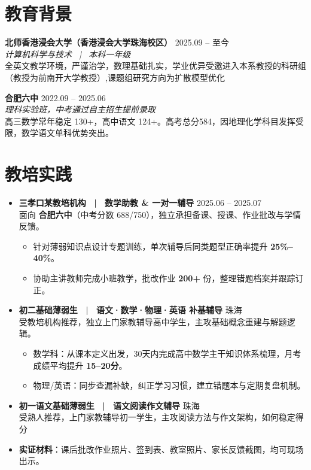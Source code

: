 \documentclass[11pt,a4paper]{ctexart}
\begin{document}
\section{\faUniversity \quad 教育背景}
\textbf{北师香港浸会大学（香港浸会大学珠海校区）} \hfill 2025.09 -- 至今\\
\textit{计算机科学与技术 \ | \ 本科一年级}\\
\textcolor{darktext}{全英文教学环境，严谨治学，数理基础扎实，学业优异受邀进入本系教授的科研组（教授为前南开大学教授）,课题组研究方向为扩散模型优化}

\vspace{2pt}
\textbf{合肥六中} \hfill 2022.09 -- 2025.06\\
\textit{理科实验班，中考通过自主招生提前录取}\\
\textcolor{darktext}{高三数学常年稳定 130+，高中语文 124+。高考总分584，因地理化学科目发挥受限，数学语文单科优势突出。}

\section{\faChalkboardTeacher \quad 教培实践}
\begin{itemize}[leftmargin=1.2em]
    \item \textbf{三孝口某教培机构 \ | \ 数学助教 \& 一对一辅导} \hfill 2025.06 -- 2025.07\\
    面向 \textbf{合肥六中}（中考分数 688/750），独立承担备课、授课、作业批改与学情反馈。
    \begin{itemize}
        \item 针对薄弱知识点设计专题训练，单次辅导后同类题型正确率提升 \textbf{25\%--40\%}。
        \item 协助主讲教师完成小班教学，批改作业 \textbf{200+} 份，整理错题档案并跟踪订正。
    \end{itemize}

    \item \textbf{初二基础薄弱生 \ | \ 语文·数学·物理·英语 补基辅导} \hfill 珠海\\
    受教培机构推荐，独立上门家教辅导高中学生，主攻基础概念重建与解题逻辑。
    \begin{itemize}
        \item 数学科：从课本定义出发，30天内完成高中数学主干知识体系梳理，月考成绩平均提升 \textbf{15--20分}。
        \item 物理/英语：同步查漏补缺，纠正学习习惯，建立错题本与定期复盘机制。
    \end{itemize}
     \item \textbf{初一语文基础薄弱生 \ | \ 语文阅读作文辅导} \hfill 珠海\\
    受熟人推荐，上门家教辅导初一学生，主攻阅读方法与作文架构，如何稳定得分
    
    \item \textbf{实证材料}：课后批改作业照片、签到表、教室照片、家长反馈截图，均可现场出示。
\end{itemize}
\end{document}
